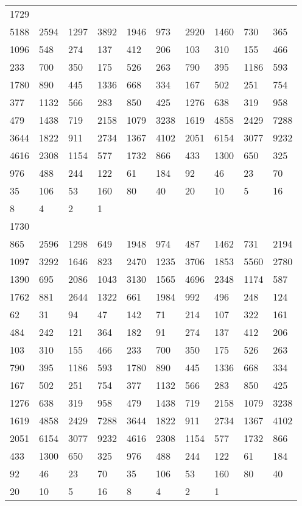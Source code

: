 \begin{longtable}{*{10}{l}}
1729&&&&&&&&&\\
5188& 2594& 1297& 3892& 1946& 973& 2920& 1460& 730& 365\\
1096& 548& 274& 137& 412& 206& 103& 310& 155& 466\\
233& 700& 350& 175& 526& 263& 790& 395& 1186& 593\\
1780& 890& 445& 1336& 668& 334& 167& 502& 251& 754\\
377& 1132& 566& 283& 850& 425& 1276& 638& 319& 958\\
479& 1438& 719& 2158& 1079& 3238& 1619& 4858& 2429& 7288\\
3644& 1822& 911& 2734& 1367& 4102& 2051& 6154& 3077& 9232\\
4616& 2308& 1154& 577& 1732& 866& 433& 1300& 650& 325\\
976& 488& 244& 122& 61& 184& 92& 46& 23& 70\\
35& 106& 53& 160& 80& 40& 20& 10& 5& 16\\
8& 4& 2& 1& \\

1730&&&&&&&&&\\
865& 2596& 1298& 649& 1948& 974& 487& 1462& 731& 2194\\
1097& 3292& 1646& 823& 2470& 1235& 3706& 1853& 5560& 2780\\
1390& 695& 2086& 1043& 3130& 1565& 4696& 2348& 1174& 587\\
1762& 881& 2644& 1322& 661& 1984& 992& 496& 248& 124\\
62& 31& 94& 47& 142& 71& 214& 107& 322& 161\\
484& 242& 121& 364& 182& 91& 274& 137& 412& 206\\
103& 310& 155& 466& 233& 700& 350& 175& 526& 263\\
790& 395& 1186& 593& 1780& 890& 445& 1336& 668& 334\\
167& 502& 251& 754& 377& 1132& 566& 283& 850& 425\\
1276& 638& 319& 958& 479& 1438& 719& 2158& 1079& 3238\\
1619& 4858& 2429& 7288& 3644& 1822& 911& 2734& 1367& 4102\\
2051& 6154& 3077& 9232& 4616& 2308& 1154& 577& 1732& 866\\
433& 1300& 650& 325& 976& 488& 244& 122& 61& 184\\
92& 46& 23& 70& 35& 106& 53& 160& 80& 40\\
20& 10& 5& 16& 8& 4& 2& 1& \\


\end{longtable}
